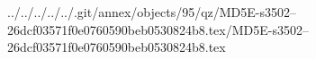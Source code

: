 ../../../../../.git/annex/objects/95/qz/MD5E-s3502--26dcf03571f0e0760590beb0530824b8.tex/MD5E-s3502--26dcf03571f0e0760590beb0530824b8.tex